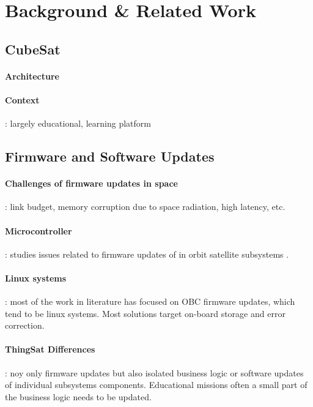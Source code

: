 \section{Background \& Related Work}
\label{sec:background-related-work}

\subsection{CubeSat}
\label{sec:cubesat}
\paragraph*{Architecture}
\paragraph*{Context}: largely educational, learning platform

\subsection{Firmware and Software Updates}
\label{sec:fu-cubesat}

\paragraph*{Challenges of firmware updates in space}: link budget, memory corruption
due to space radiation, high latency, etc.
\paragraph*{Microcontroller}: studies issues related to firmware updates of in
orbit satellite subsystems \cite{sunter2016updatesnano}.
\paragraph*{Linux systems}: most of the work in literature has focused on OBC firmware
updates, which tend to be linux systems. Most solutions target on-board storage
and error correction. \cite{FitzsimmonsReliableSoftwareUpdates}
\paragraph*{ThingSat Differences}: noy only firmware updates but also isolated business
logic or software updates of individual subsystems components. Educational missions
often a small part of the business logic needs to be updated.
